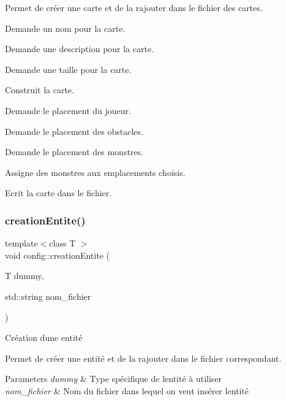 Permet de créer une carte et de la rajouter dans le fichier des cartes.


\begin{DoxyItemize}
\item Demande un nom pour la carte.
\item Demande une description pour la carte.
\item Demande une taille pour la carte.
\item Construit la carte.
\item Demande le placement du joueur.
\item Demande le placement des obstacles.
\item Demande le placement des monstres.
\item Assigne des monstres aux emplacements choisis.
\item Ecrit la carte dans le fichier. 
\end{DoxyItemize}\mbox{\label{classconfig_a2df74fdb5ab353576bb8758259d8bc22}} 
\subsubsection{\texorpdfstring{creation\+Entite()}{creationEntite()}}
{\footnotesize\ttfamily template$<$class T $>$ \\
void config\+::creation\+Entite (\begin{DoxyParamCaption}\item[{T}]{dummy,  }\item[{std\+::string}]{nom\+\_\+fichier }\end{DoxyParamCaption})\hspace{0.3cm}{\ttfamily [inline]}}



Création d\textquotesingle{}une entité 

Permet de créer une entité et de la rajouter dans le fichier correspondant. 
\begin{DoxyParams}{Parameters}
{\em dummy} & Type spécifique de l\textquotesingle{}entité à utiliser \\
\hline
{\em nom\+\_\+fichier} & Nom du fichier dans lequel on veut insérer l\textquotesingle{}entité \\
\hline
\end{DoxyParams}
\mbox{\label{classconfig_af343d1915cc536ae272c9fa3e321f4fc}} 
